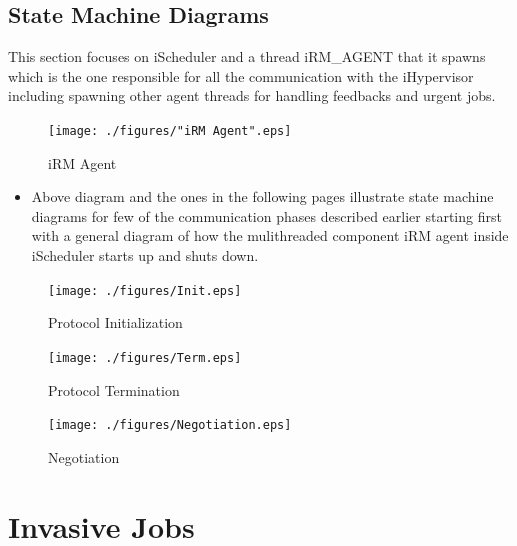 \subsection{State Machine Diagrams}
This section focuses on iScheduler and a thread iRM\_AGENT that it spawns which is the one responsible for all the communication with the iHypervisor including spawning other agent threads for handling feedbacks and urgent jobs.
\vspace{10mm}
\begin{figure}[h]
\centering
\texttt{[image: ./figures/"iRM Agent".eps]}
\caption{iRM Agent}
\label{fig:Init}
\end{figure}
\begin{itemize}
\item Above diagram and the ones in the following pages illustrate state machine diagrams for few of the communication phases described earlier starting first with a general diagram of how the mulithreaded component iRM agent inside iScheduler starts up and shuts down.
\end{itemize}
\vspace{-20mm}
\begin{figure}[h]
\centering
\texttt{[image: ./figures/Init.eps]}
\caption{Protocol Initialization}
\label{fig:Init}
\end{figure}
\vspace{5mm}
\begin{figure}[h]
\centering
\texttt{[image: ./figures/Term.eps]}
\caption{Protocol Termination}
\label{fig:Term}
\end{figure}
\clearpage
\begin{figure}[h]
\centering
\texttt{[image: ./figures/Negotiation.eps]}
\caption{Negotiation}
\label{fig:Neg}
\end{figure}
\clearpage

\section{Invasive Jobs}
